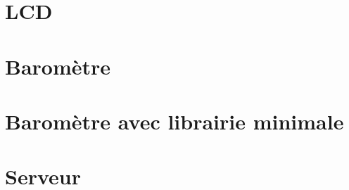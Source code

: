 \documentclass{report}
\begin{document}
	\chapter{LCD\label{code:lcd}}
		
	\chapter{Baromètre\label{code:bme}}
		
			
	\chapter{Baromètre avec librairie minimale\label{code:bme2}}
		
		
	\chapter{Serveur}
		
\end{document}
